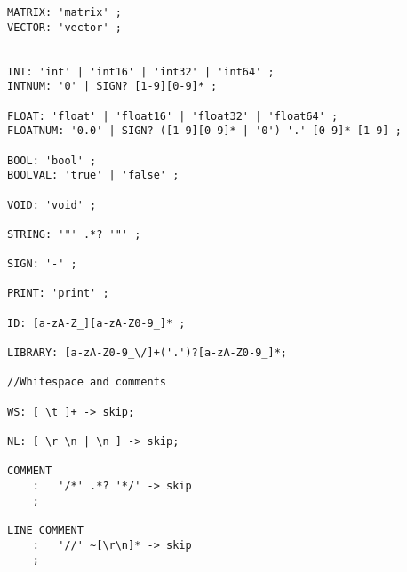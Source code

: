 \begin{lstlisting}[caption={\acrshort{cfg} and Lexing rules},frame=tlrb,numbers=none]
MATRIX: 'matrix' ;
VECTOR: 'vector' ;


INT: 'int' | 'int16' | 'int32' | 'int64' ;
INTNUM: '0' | SIGN? [1-9][0-9]* ;

FLOAT: 'float' | 'float16' | 'float32' | 'float64' ;  
FLOATNUM: '0.0' | SIGN? ([1-9][0-9]* | '0') '.' [0-9]* [1-9] ;

BOOL: 'bool' ;
BOOLVAL: 'true' | 'false' ;

VOID: 'void' ;

STRING: '"' .*? '"' ;

SIGN: '-' ;   

PRINT: 'print' ; 

ID: [a-zA-Z_][a-zA-Z0-9_]* ;    

LIBRARY: [a-zA-Z0-9_\/]+('.')?[a-zA-Z0-9_]*;

//Whitespace and comments

WS: [ \t ]+ -> skip;

NL: [ \r \n | \n ] -> skip;

COMMENT
    :   '/*' .*? '*/' -> skip
    ;

LINE_COMMENT
    :   '//' ~[\r\n]* -> skip
    ;

\end{lstlisting}